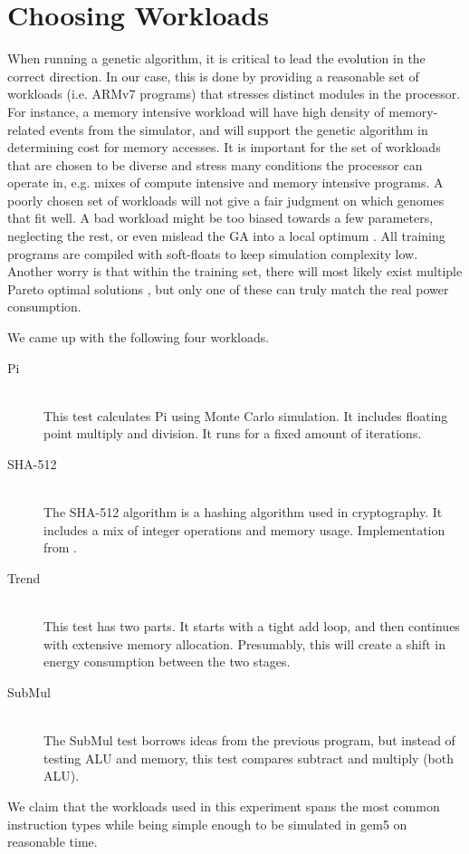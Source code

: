 \section{Choosing Workloads}
\label{sec:workloads}

When running a genetic algorithm, it is critical to lead the evolution in the
correct direction. In our case, this is done by providing a reasonable set of
workloads (i.e. ARMv7 programs) that stresses distinct modules in the processor.
For instance, a memory intensive workload will have high density of
memory-related events from the simulator, and will support the genetic algorithm
in determining cost for memory accesses. It is important for the set of
workloads that are chosen to be diverse and stress many conditions the processor
can operate in, e.g. mixes of compute intensive and memory intensive programs. A
poorly chosen set of workloads will not give a fair judgment on which genomes
that fit well. A bad workload might be too biased towards a few parameters,
neglecting the rest, or even mislead the GA into a local optimum
\cite{introtoga}. All training programs are compiled with soft-floats to keep
simulation complexity low. Another worry is that within the training set, there
will most likely exist multiple Pareto optimal solutions \cite{deb2014multi},
but only one of these can truly match the real power consumption.

We came up with the following four workloads.

\begin{description}
    \item[Pi] \hfill \\
        This test calculates Pi using Monte Carlo simulation. It includes
        floating point multiply and division. It runs for a fixed amount of
        iterations.
    \item[SHA-512] \hfill \\
        The SHA-512 algorithm is a hashing algorithm used in cryptography. It
        includes a mix of integer operations and memory usage. Implementation
        from \cite{sha2}.
    \item[Trend] \hfill \\
        This test has two parts. It starts with a tight add loop, and then
        continues with extensive memory allocation. Presumably, this will create
        a shift in energy consumption between the two stages.
    \item[SubMul] \hfill \\
        The SubMul test borrows ideas from the previous program, but instead of
        testing ALU and memory, this test compares subtract and multiply (both
        ALU).
\end{description}

We claim that the workloads used in this experiment spans the most common
instruction types while being simple enough to be simulated in gem5 on
reasonable time.

